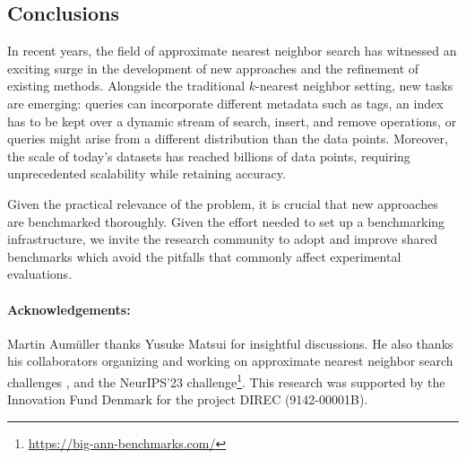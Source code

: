 \documentclass[11pt]{article}
\begin{document}
\subsection{Conclusions}

In recent years, the field of approximate nearest
neighbor search has witnessed an exciting surge in the development of new approaches and the refinement of existing methods. Alongside the
traditional $k$-nearest neighbor setting, new tasks are emerging:
queries can incorporate different metadata such as tags, an index has to be kept over a dynamic stream of search, insert, and remove operations, or queries might arise from a different
distribution than the data points. Moreover, the scale of today's datasets has reached billions of data points, requiring unprecedented scalability while retaining
accuracy.

Given the practical relevance of the problem, it is crucial that new approaches
are benchmarked thoroughly. Given the effort needed to set up a benchmarking
infrastructure, we invite the research community to adopt and improve shared benchmarks which avoid the pitfalls that commonly affect experimental evaluations.



\paragraph{Acknowledgements:} Martin Aumüller thanks Yusuke Matsui for insightful discussions. He also thanks his collaborators
organizing and working on approximate nearest neighbor search challenges
\cite{DBLP:conf/nips/SimhadriWADBBCH21,sisap23challenge}, and the NeurIPS'23 challenge\footnote{\url{https://big-ann-benchmarks.com/}}. This research was supported by the Innovation Fund Denmark for the project DIREC
(9142-00001B).

 

\end{document}

